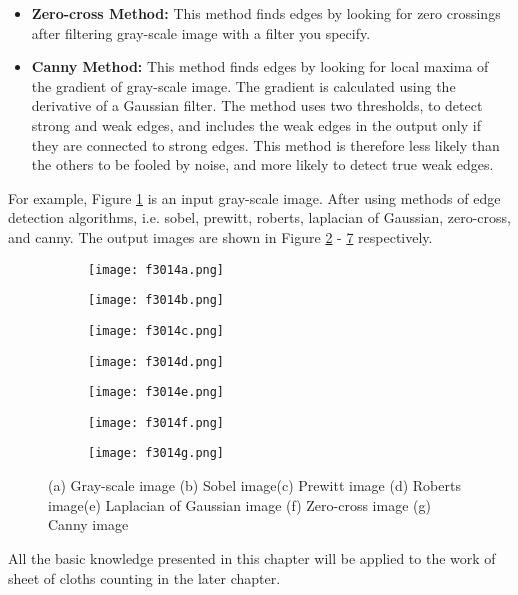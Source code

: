 \begin{itemize}
	\item{\textbf{Zero-cross Method:} This method finds edges by looking for zero crossings after filtering gray-scale image with a filter you specify.}
	\item{\textbf{Canny Method:} This method finds edges by looking for local maxima of the gradient of gray-scale image. The gradient is calculated using the derivative of a Gaussian filter. The method uses two thresholds, to detect strong and weak edges, and includes the weak edges in the output only if they are connected to strong edges. This method is therefore less likely than the others to be fooled by noise, and more likely to detect true weak edges.}
\end{itemize}

For example, Figure \ref{fig:f3014a} is an input gray-scale image. After using methods of edge detection algorithms, i.e. sobel, prewitt, roberts, laplacian of Gaussian, zero-cross, and canny. The output images are shown in Figure \ref{fig:f3014b} - \ref{fig:f3014g} respectively.
\begin{figure}
	\centering
	\begin{subfigure}[b]{0.4\textwidth}
		\texttt{[image: f3014a.png]}
		\caption{}\label{fig:f3014a}
	\end{subfigure}
	\begin{subfigure}[b]{0.4\textwidth}
		\texttt{[image: f3014b.png]}
		\caption{}\label{fig:f3014b}
	\end{subfigure}
	\begin{subfigure}[b]{0.4\textwidth}
		\texttt{[image: f3014c.png]}
		\caption{}\label{fig:f3014c}
	\end{subfigure}
	\begin{subfigure}[b]{0.4\textwidth}
		\texttt{[image: f3014d.png]}
		\caption{}\label{fig:f3014d}
	\end{subfigure}
	\begin{subfigure}[b]{0.4\textwidth}
		\texttt{[image: f3014e.png]}
		\caption{}\label{fig:f3014e}
	\end{subfigure}
	\begin{subfigure}[b]{0.4\textwidth}
		\texttt{[image: f3014f.png]}
		\caption{}\label{fig:f3014f}
	\end{subfigure}
	\begin{subfigure}[b]{0.4\textwidth}
		\texttt{[image: f3014g.png]}
		\caption{}\label{fig:f3014g}
	\end{subfigure}
	\caption{(a) Gray-scale image (b) Sobel image(c) Prewitt image (d) Roberts image(e) Laplacian of Gaussian image (f) Zero-cross image (g) Canny image }\label{fig:f3014}
\end{figure}

All the basic knowledge presented in this chapter will be applied to the work of sheet of cloths counting in the later chapter.